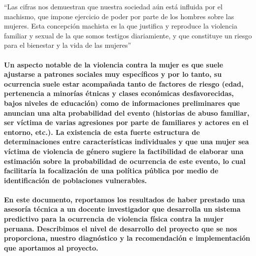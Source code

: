 \documentclass[]{article}
\let\oldparagraph\paragraph
\renewcommand{\paragraph}[1]{\oldparagraph{#1}\mbox{}}
\begin{document}
``Las cifras nos demuestran que nuestra sociedad aún está influida por
el machismo, que impone ejercicio de poder por parte de los hombres
sobre las mujeres. Esta concepción machista es la que justifica y
reproduce la violencia familiar y sexual de la que somos testigos
diariamiente, y que constituye un riesgo para el bienestar y la vida de
las mujeres''

\paragraph{Un aspecto notable de la violencia contra la mujer es que
suele ajustarse a patrones sociales muy específicos y por lo tanto, su
ocurrencia suele estar acompañada tanto de factores de riesgo (edad,
pertenencia a minorías étnicas y clases económicas desfavorecidas, bajos
niveles de educación) como de informaciones preliminares que anuncian
una alta probabilidad del evento (historias de abuso familiar, ser
víctima de varias agresiones por parte de familiares y actores en el
entorno, etc.). La existencia de esta fuerte estructura de
determinaciones entre características individuales y que una mujer sea
víctima de violencia de género sugiere la factibilidad de elaborar una
estimación sobre la probabilidad de ocurrencia de este evento, lo cual
facilitaría la focalización de una política pública por medio de
identificación de poblaciones
vulnerables.}\label{un-aspecto-notable-de-la-violencia-contra-la-mujer-es-que-suele-ajustarse-a-patrones-sociales-muy-especificos-y-por-lo-tanto-su-ocurrencia-suele-estar-acompanada-tanto-de-factores-de-riesgo-edad-pertenencia-a-minorias-etnicas-y-clases-economicas-desfavorecidas-bajos-niveles-de-educacion-como-de-informaciones-preliminares-que-anuncian-una-alta-probabilidad-del-evento-historias-de-abuso-familiar-ser-victima-de-varias-agresiones-por-parte-de-familiares-y-actores-en-el-entorno-etc..-la-existencia-de-esta-fuerte-estructura-de-determinaciones-entre-caracteristicas-individuales-y-que-una-mujer-sea-victima-de-violencia-de-genero-sugiere-la-factibilidad-de-elaborar-una-estimacion-sobre-la-probabilidad-de-ocurrencia-de-este-evento-lo-cual-facilitaria-la-focalizacion-de-una-politica-publica-por-medio-de-identificacion-de-poblaciones-vulnerables.}

\paragraph{En este documento, reportamos los resultados de haber
prestado una asesoría técnica a un docente investigador que desarrolla
un sistema predictivo para la ocurrencia de violencia física contra la
mujer peruana. Describimos el nivel de desarrollo del proyecto que se
nos proporciona, nuestro diagnóstico y la recomendación e implementación
que aportamos al
proyecto.}\label{en-este-documento-reportamos-los-resultados-de-haber-prestado-una-asesoria-tecnica-a-un-docente-investigador-que-desarrolla-un-sistema-predictivo-para-la-ocurrencia-de-violencia-fisica-contra-la-mujer-peruana.-describimos-el-nivel-de-desarrollo-del-proyecto-que-se-nos-proporciona-nuestro-diagnostico-y-la-recomendacion-e-implementacion-que-aportamos-al-proyecto.}
\end{document}
